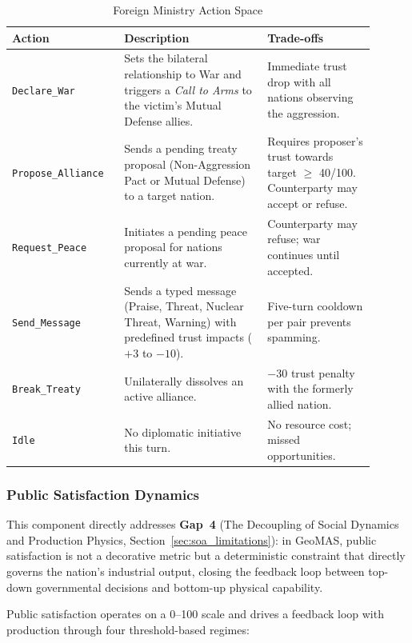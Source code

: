 \begin{table}[H]
\centering
\begin{tabular}{|p{0.27\linewidth}|p{0.36\linewidth}|p{0.27\linewidth}|}
\hline
\textbf{Action} & \textbf{Description} & \textbf{Trade-offs} \\ \hline
\texttt{Declare\_War} & Sets the bilateral relationship to War and triggers a \textit{Call to Arms} to the victim's Mutual Defense allies. & Immediate trust drop with all nations observing the aggression. \\ \hline
\texttt{Propose\_Alliance} & Sends a pending treaty proposal (Non-Aggression Pact or Mutual Defense) to a target nation. & Requires proposer's trust towards target $\geq$ 40/100. Counterparty may accept or refuse. \\ \hline
\texttt{Request\_Peace} & Initiates a pending peace proposal for nations currently at war. & Counterparty may refuse; war continues until accepted. \\ \hline
\texttt{Send\_Message} & Sends a typed message (Praise, Threat, Nuclear Threat, Warning) with predefined trust impacts ($+3$ to $-10$). & Five-turn cooldown per pair prevents spamming. \\ \hline
\texttt{Break\_Treaty} & Unilaterally dissolves an active alliance. & $-30$ trust penalty with the formerly allied nation. \\ \hline
\texttt{Idle} & No diplomatic initiative this turn. & No resource cost; missed opportunities. \\ \hline
\end{tabular}
\caption{Foreign Ministry Action Space}
\label{tab:foreign_actions}
\end{table}

\subsubsection{Public Satisfaction Dynamics}
\label{sec:satisfaction}
This component directly addresses \textbf{Gap~4} (The Decoupling of Social Dynamics and Production Physics, Section~\ref{sec:soa_limitations}): in GeoMAS, public satisfaction is not a decorative metric but a deterministic constraint that directly governs the nation's industrial output, closing the feedback loop between top-down governmental decisions and bottom-up physical capability.

Public satisfaction operates on a 0--100 scale and drives a feedback loop with production through four threshold-based regimes:

